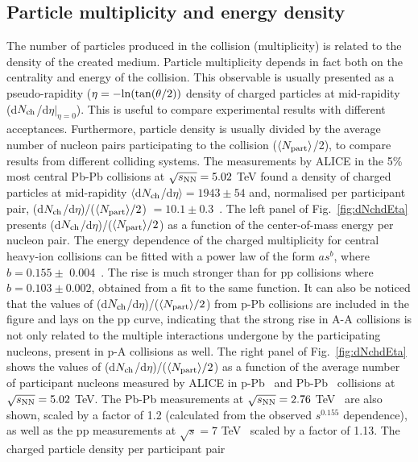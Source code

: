 \subsection{Particle multiplicity and energy density}
The number of particles produced in the collision (multiplicity) is related to the 
density of the created medium. Particle multiplicity depends in fact both on the 
centrality and energy of the collision. This observable is usually presented as 
a pseudo-rapidity ($\eta = - {\rm ln}(\tan(\theta/2))$ density of charged particles at 
mid-rapidity (d$N_{\rm ch}$/d$\eta |_{\eta=0}$). This is useful to compare experimental 
results with different acceptances. Furthermore, particle density is usually 
divided by the average number of nucleon pairs participating to the collision 
($\langle N_{\rm part}\rangle$/2), to compare results from different 
colliding systems. The measurements by ALICE in the 5\% 
most central Pb-Pb collisions at $\sqrt{s_{\rm NN}} = 5.02$ TeV found a density of charged 
particles at mid-rapidity $\langle $d$N_{\rm ch}$/d$\eta \rangle = 1943 \pm 54$ 
and, normalised per participant pair, (d$N_{\rm ch}$/d$\eta$)/($\langle N_{\rm part} \rangle/2$) $ 
= 10.1 \pm 0.3$~\cite{Adam:2015ptt}.  
The left panel of Fig.~\ref{fig:dNchdEta} presents (d$N_{\rm ch}$/d$\eta$)/($\langle N_{\rm part} \rangle/2$) 
as a function of the center-of-mass energy per nucleon pair. The energy dependence 
of the charged multiplicity for central heavy-ion collisions can be fitted with a power 
law of the form $as^b$, where $b = 0.155 \pm$ 0.004~\cite{Adam:2015ptt}. 
The rise is much stronger than for pp collisions where $b = 0.103 \pm 0.002$, 
obtained from a fit to the same function. It can also be noticed that the values 
of (d$N_{\rm ch}$/d$\eta$)/($\langle N_{\rm part} \rangle/2$) from p-Pb collisions are included in the figure 
and lays on the pp curve, indicating that the strong rise in A-A collisions is not 
only related to the multiple interactions undergone by the participating nucleons, 
present in p-A collisions as well. The right panel of Fig.~\ref{fig:dNchdEta} 
shows the values of (d$N_{\rm ch}$/d$\eta$)/($\langle N_{\rm part} \rangle/2$) 
as a function of the average number of participant nucleons 
measured by ALICE in p-Pb~\cite{ALICE:2012xs} and Pb-Pb~\cite{Adam:2015ptt} 
collisions at $\sqrt{s_{\rm NN}} = 5.02$ TeV. The Pb-Pb measurements at 
$\sqrt{s_{\rm NN}} = 2.76 $ TeV~\cite{Aamodt:2010cz} are also shown, scaled by a 
factor of 1.2 (calculated from the observed $s^{0.155}$ dependence), as 
well as the pp measurements at $\sqrt{s}= 7$ TeV~\cite{Adam:2015gka} 
scaled by a factor of 1.13. The charged particle density per participant pair 
